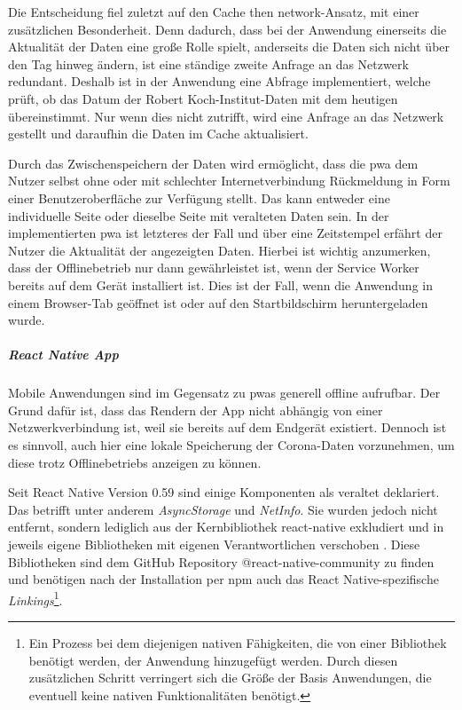Die Entscheidung fiel zuletzt auf den \glqq Cache then network\grqq{}-Ansatz, mit einer zusätzlichen Besonderheit.
Denn dadurch, dass bei der Anwendung einerseits die Aktualität der Daten eine große Rolle spielt, anderseits die Daten sich nicht über den Tag hinweg ändern, ist eine ständige zweite Anfrage an das Netzwerk redundant.
Deshalb ist in der Anwendung eine Abfrage implementiert, welche prüft, ob das Datum der Robert Koch-Institut-Daten mit dem heutigen übereinstimmt.
Nur wenn dies nicht zutrifft, wird eine Anfrage an das Netzwerk gestellt und daraufhin die Daten im Cache aktualisiert.

Durch das Zwischenspeichern der Daten wird ermöglicht, dass die \ac{pwa} dem Nutzer selbst ohne oder mit schlechter Internetverbindung Rückmeldung in Form einer Benutzeroberfläche zur Verfügung stellt.
Das kann entweder eine individuelle Seite oder dieselbe Seite mit veralteten Daten sein.
In der implementierten \ac{pwa} ist letzteres der Fall und über eine Zeitstempel erfährt der Nutzer die Aktualität der angezeigten Daten.
Hierbei ist wichtig anzumerken, dass der Offlinebetrieb nur dann gewährleistet ist, wenn der Service Worker bereits auf dem Gerät installiert ist.
Dies ist der Fall, wenn die Anwendung in einem Browser-Tab geöffnet ist oder auf den Startbildschirm heruntergeladen wurde.

\subparagraph{React Native App\\}
Mobile Anwendungen sind im Gegensatz zu \acp{pwa} generell offline aufrufbar.
Der Grund dafür ist, dass das Rendern der App nicht abhängig von einer Netzwerkverbindung ist, weil sie bereits auf dem Endgerät existiert.
Dennoch ist es sinnvoll, auch hier eine lokale Speicherung der Corona-Daten vorzunehmen, um diese trotz Offlinebetriebs anzeigen zu können.

Seit React Native Version 0.59 sind einige Komponenten als veraltet deklariert.
Das betrifft unter anderem \textit{AsyncStorage} und \textit{NetInfo}.
Sie wurden jedoch nicht entfernt, sondern lediglich aus der Kernbibliothek react-native exkludiert und in jeweils eigene Bibliotheken mit eigenen Verantwortlichen verschoben \cite{Turner.2019}.
Diese Bibliotheken sind dem GitHub Repository @react-native-community zu finden und benötigen nach der Installation per npm auch das React Native-spezifische \textit{Linkings}\footnote{Ein Prozess bei dem diejenigen nativen Fähigkeiten, die von einer Bibliothek benötigt werden, der Anwendung hinzugefügt werden. Durch diesen zusätzlichen Schritt verringert sich die Größe der Basis Anwendungen, die eventuell keine nativen Funktionalitäten benötigt.}.


